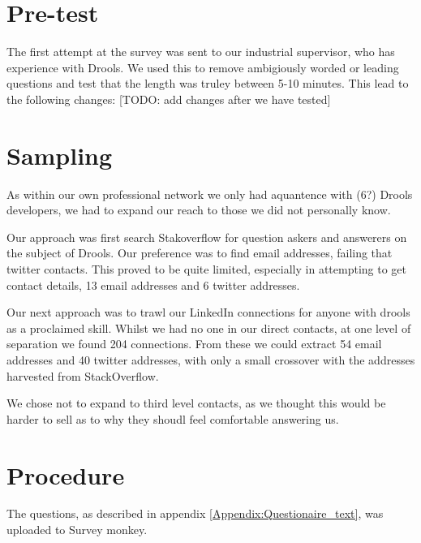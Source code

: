 \section{Pre-test}
The first attempt at the survey was sent to our industrial supervisor, who has experience with Drools.
We used this to remove ambigiously worded or leading questions and test that the length was truley between 5-10 minutes.
This lead to the following changes:
[TODO: add changes after we have tested]


\section{Sampling}
As within our own professional network we only had aquantence with (6?) Drools developers, we had to expand our reach to those we did not personally know.

Our approach was first search Stakoverflow for question askers and answerers on the subject of Drools.
Our preference was to find email addresses, failing that twitter contacts.
This proved to be quite limited, especially in attempting to get contact details, 13 email addresses and 6 twitter addresses.

Our next approach was to trawl our LinkedIn connections for anyone with drools as a proclaimed skill.
Whilst we had no one in our direct contacts, at one level of separation we found 204 connections.
From these we could extract 54 email addresses and 40 twitter addresses, with only a small crossover with the addresses harvested from StackOverflow.

We chose not to expand to third level contacts, as we thought this would be harder to sell as to why they shoudl feel comfortable answering us.

\section{Procedure}

The questions, as described in appendix \ref{Appendix:Questionaire_text}, was uploaded to Survey monkey.

